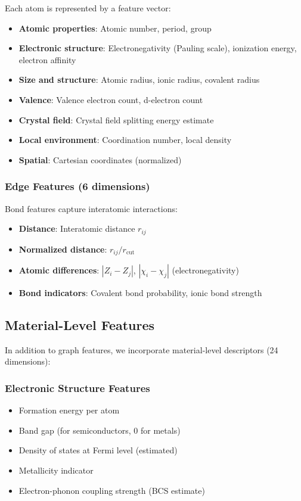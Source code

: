 \documentclass[11pt,a4paper]{article}
\begin{document}
Each atom is represented by a feature vector:

\begin{itemize}
    \item \textbf{Atomic properties}: Atomic number, period, group
    \item \textbf{Electronic structure}: Electronegativity (Pauling scale), ionization energy, electron affinity
    \item \textbf{Size and structure}: Atomic radius, ionic radius, covalent radius
    \item \textbf{Valence}: Valence electron count, d-electron count
    \item \textbf{Crystal field}: Crystal field splitting energy estimate
    \item \textbf{Local environment}: Coordination number, local density
    \item \textbf{Spatial}: Cartesian coordinates (normalized)
\end{itemize}

\subsubsection{Edge Features (6 dimensions)}

Bond features capture interatomic interactions:

\begin{itemize}
    \item \textbf{Distance}: Interatomic distance $r_{ij}$
    \item \textbf{Normalized distance}: $r_{ij} / r_{\text{cut}}$
    \item \textbf{Atomic differences}: $|Z_i - Z_j|$, $|\chi_i - \chi_j|$ (electronegativity)
    \item \textbf{Bond indicators}: Covalent bond probability, ionic bond strength
\end{itemize}

\subsection{Material-Level Features}

In addition to graph features, we incorporate material-level descriptors (24 dimensions):

\subsubsection{Electronic Structure Features}
\begin{itemize}
    \item Formation energy per atom
    \item Band gap (for semiconductors, 0 for metals)
    \item Density of states at Fermi level (estimated)
    \item Metallicity indicator
    \item Electron-phonon coupling strength (BCS estimate)
\end{itemize}
\end{document}
